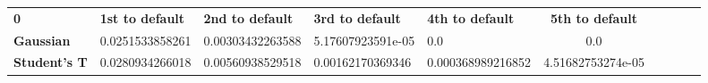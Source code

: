 \begin{tabular}{|l|l|l|l|l|c|c|c|c|c|}
\hline
\textbf{0} & \textbf{1st to default} & \textbf{2nd to default} & \textbf{3rd to default} & \textbf{4th to default} & \textbf{5th to default}\\\hhline{|=|=|=|=|=|=|}
\textbf{Gaussian} & 0.0251533858261 & 0.00303432263588 & 5.17607923591e-05 & 0.0 & 0.0\\
\textbf{Student's T} & 0.0280934266018 & 0.00560938529518 & 0.00162170369346 & 0.000368989216852 & 4.51682753274e-05\\
\hline
\end{tabular}
